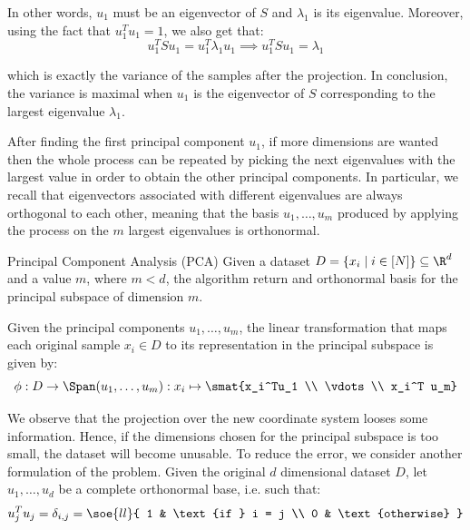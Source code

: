 \documentclass[a4paper, 12pt]{report}
\begin{document}
    In other words, $u_1$ must be an eigenvector of $S$ and $\lambda_1$ is its eigenvalue. Moreover, using the fact that $u_1^T u_1 = 1$, we also get that:
    \[u_1^T S u_1 = u_1^T \lambda_1 u_1 \implies u_1^T S u_1 = \lambda_1\]

    which is exactly the variance of the samples after the projection. In conclusion, the variance is maximal when $u_1$ is the eigenvector of $S$ corresponding to the largest eigenvalue $\lambda_1$.

    After finding the first principal component $u_1$, if more dimensions are wanted then the whole process can be repeated by picking the next eigenvalues with the largest value in order to obtain the other principal components. In particular, we recall that eigenvectors associated with different eigenvalues are always orthogonal to each other, meaning that the basis $u_1, \ldots, u_m$ produced by applying the process on the $m$ largest eigenvalues is orthonormal.
    
    \begin{framedalgo}{Principal Component Analysis (PCA)}
        Given a dataset $D = \{x_i \mid i \in [N]\} \subseteq \R^d$ and a value $m$, where $m < d$, the algorithm return and orthonormal basis for the principal subspace of dimension $m$.

        \begin{algorithmic}
            \EndFunction
        \end{algorithmic}
    \end{framedalgo}

    Given the principal components $u_1, \ldots, u_m$, the linear transformation that maps each original sample $x_i \in D$ to its representation in the principal subspace is given by:
    \[\phi : D \to \Span(u_1, \ldots, u_m) : x_i \mapsto \smat{x_i^Tu_1 \\ \vdots \\ x_i^T u_m}\]

    We observe that the projection over the new coordinate system looses some information. Hence, if the dimensions chosen for the principal subspace is too small, the dataset will become unusable. To reduce the error, we consider another formulation of the problem. Given the original $d$ dimensional dataset $D$, let $u_1, \ldots, u_d$ be a complete orthonormal base, i.e. such that:
    \[u_j^T u_j = \delta_{i,j} = \soe{ll}{
        1 & \text{if } i = j \\
        0 & \text{otherwise} 
    }\]
\end{document}
